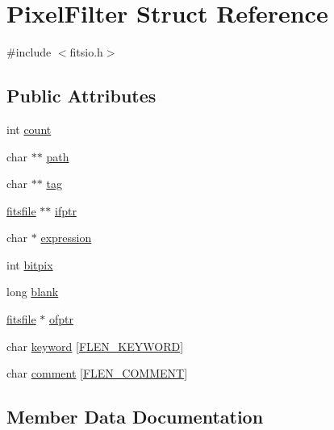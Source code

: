 \hypertarget{struct_pixel_filter}{}\section{Pixel\+Filter Struct Reference}
\label{struct_pixel_filter}


{\ttfamily \#include $<$fitsio.\+h$>$}

\subsection*{Public Attributes}
\begin{DoxyCompactItemize}
\item 
int \hyperlink{struct_pixel_filter_a2879e455787a34d782aacc3212a442a4}{count}
\item 
char $\ast$$\ast$ \hyperlink{struct_pixel_filter_abe91d3da0379f2f5c3e4b723451e9a3c}{path}
\item 
char $\ast$$\ast$ \hyperlink{struct_pixel_filter_a71b96f3e8b70a5fefeca1fa33a2bf716}{tag}
\item 
\hyperlink{structfitsfile}{fitsfile} $\ast$$\ast$ \hyperlink{struct_pixel_filter_aac89ff8afdab01de175221df31c2065c}{ifptr}
\item 
char $\ast$ \hyperlink{struct_pixel_filter_a522c42cc7280fbbf0370801fc348f245}{expression}
\item 
int \hyperlink{struct_pixel_filter_a95dfe3a2d950b0f4d769ad002ff05470}{bitpix}
\item 
long \hyperlink{struct_pixel_filter_a05855896303f3c561e5b126301b0a82d}{blank}
\item 
\hyperlink{structfitsfile}{fitsfile} $\ast$ \hyperlink{struct_pixel_filter_ac5bd6de199aef2c93f36b37099ce5e96}{ofptr}
\item 
char \hyperlink{struct_pixel_filter_a55f192f2304f0a25e0c2bbdcb1cb68be}{keyword} \mbox{[}\hyperlink{fitsio_8h_aa5a1b2fd338bc483b8d17d5a55bebf0f}{F\+L\+E\+N\+\_\+\+K\+E\+Y\+W\+O\+RD}\mbox{]}
\item 
char \hyperlink{struct_pixel_filter_aeaf146b3c9fc9262622df5b9cb82a528}{comment} \mbox{[}\hyperlink{fitsio_8h_afdaac41766536efdcd792c8935b6a9d6}{F\+L\+E\+N\+\_\+\+C\+O\+M\+M\+E\+NT}\mbox{]}
\end{DoxyCompactItemize}


\subsection{Member Data Documentation}
\mbox{\label{struct_pixel_filter_a95dfe3a2d950b0f4d769ad002ff05470}} 
